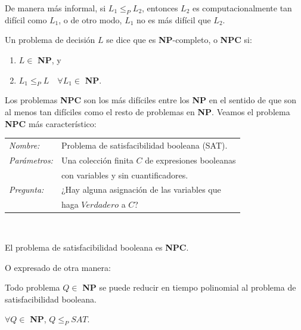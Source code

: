 \hfil

De manera más informal, si $L_1 \leq_P L_2$, entonces $L_2$ es computacionalmente tan difícil como $L_1$, o de otro modo, $L_1$ no es más difícil que $L_2$.

\begin{definition}
	Un problema de decisión $L$ se dice que es \textbf{NP}-completo, o \textbf{NPC} si:
	\begin{enumerate}[label=(\roman*)]
		\item $L \in $ \textbf{NP}, y
		\item $L_1 \leq_P L \quad \forall L_1 \in $ \textbf{NP}.
	\end{enumerate}
\end{definition}

\hfil

Los problemas \textbf{NPC} son los más difíciles entre los \textbf{NP} en el sentido de que son al menos tan difíciles como el resto de problemas en \textbf{NP}. Veamos el problema \textbf{NPC} más característico:

	\begin{tabular}{|ll}
		\textit{Nombre:} & Problema de satisfacibilidad booleana (SAT). \\
		\textit{Parámetros:} & Una colección finita $C$ de expresiones booleanas \\
				 &  con variables y sin cuantificadores. \\
		\textit{Pregunta:} & ¿Hay alguna asignación de las variables que \\ & haga $Verdadero$ a $C$? \\
	\end{tabular}
	\\

\begin{theorem}
	El problema de satisfacibilidad booleana es \textbf{NPC}.
\end{theorem}


O expresado de otra manera:

\begin{theorem}
	Todo problema $Q \in $ \textbf{NP} se puede reducir en tiempo polinomial al problema de satisfacibilidad booleana.
	
	$\forall Q \in $ \textbf{NP}, $Q \leq_P SAT$.
\end{theorem}


\hfil

